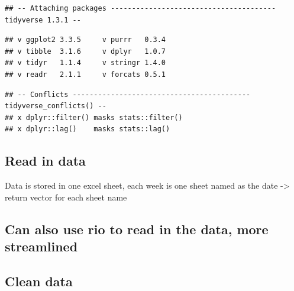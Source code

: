 \documentclass[
]{book}
\newenvironment{Shaded}{\begin{snugshade}}{\end{snugshade}}
\newcommand{\FunctionTok}[1]{\textcolor[rgb]{0.00,0.00,0.00}{#1}}
\newcommand{\NormalTok}[1]{#1}
\newcommand{\OtherTok}[1]{\textcolor[rgb]{0.56,0.35,0.01}{#1}}
\newcommand{\SpecialCharTok}[1]{\textcolor[rgb]{0.00,0.00,0.00}{#1}}
\newcommand{\StringTok}[1]{\textcolor[rgb]{0.31,0.60,0.02}{#1}}
\begin{document}
\begin{verbatim}
## -- Attaching packages --------------------------------------- tidyverse 1.3.1 --
\end{verbatim}

\begin{verbatim}
## v ggplot2 3.3.5     v purrr   0.3.4
## v tibble  3.1.6     v dplyr   1.0.7
## v tidyr   1.1.4     v stringr 1.4.0
## v readr   2.1.1     v forcats 0.5.1
\end{verbatim}

\begin{verbatim}
## -- Conflicts ------------------------------------------ tidyverse_conflicts() --
## x dplyr::filter() masks stats::filter()
## x dplyr::lag()    masks stats::lag()
\end{verbatim}

\hypertarget{read-in-data}{%
\subsection{Read in data}\label{read-in-data}}

Data is stored in one excel sheet, each week is one sheet named as the date -\textgreater{} return vector for each sheet name

\hypertarget{can-also-use-rio-to-read-in-the-data-more-streamlined}{%
\subsection{Can also use rio to read in the data, more streamlined}\label{can-also-use-rio-to-read-in-the-data-more-streamlined}}

\hypertarget{clean-data}{%
\subsection{Clean data}\label{clean-data}}

\begin{Shaded}
\end{Shaded}
\end{document}

